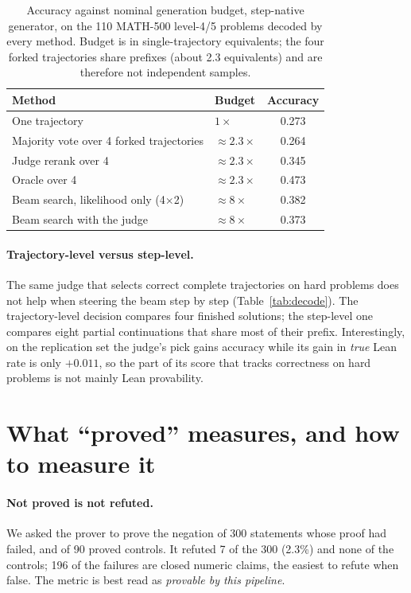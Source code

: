 \documentclass[10pt]{article}
\begin{document}
\begin{table}[t]
\caption{Accuracy against nominal generation budget, step-native generator, on the 110 MATH-500 level-4/5 problems decoded by every method. Budget is in single-trajectory equivalents; the four forked trajectories share prefixes (about 2.3 equivalents) and are therefore not independent samples.}\label{tab:budget}
\centering\small
\begin{tabular}{llc}
\toprule
Method & Budget & Accuracy\\
\midrule
One trajectory & $1\times$ & 0.273\\
Majority vote over 4 forked trajectories & $\approx 2.3\times$ & 0.264\\
Judge rerank over 4 & $\approx 2.3\times$ & 0.345\\
Oracle over 4 & $\approx 2.3\times$ & 0.473\\
Beam search, likelihood only (4$\times$2) & $\approx 8\times$ & 0.382\\
Beam search with the judge & $\approx 8\times$ & 0.373\\
\bottomrule
\end{tabular}
\end{table}

\paragraph{Trajectory-level versus step-level.} The same judge that selects correct complete trajectories on hard problems does not help when steering the beam step by step (Table~\ref{tab:decode}). The trajectory-level decision compares four finished solutions; the step-level one compares eight partial continuations that share most of their prefix. Interestingly, on the replication set the judge's pick gains accuracy while its gain in \emph{true} Lean rate is only $+0.011$, so the part of its score that tracks correctness on hard problems is not mainly Lean provability.

\section{What ``proved'' measures, and how to measure it}\label{sec:metric}

\paragraph{Not proved is not refuted.} We asked the prover to prove the negation of 300 statements whose proof had failed, and of 90 proved controls. It refuted 7 of the 300 (2.3\%) and none of the controls; 196 of the failures are closed numeric claims, the easiest to refute when false. The metric is best read as \emph{provable by this pipeline}.
\end{document}
